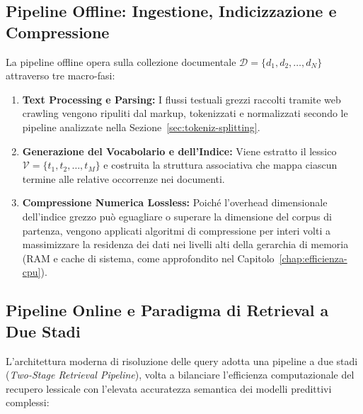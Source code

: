 \subsection[Pipeline Offline: Ingestione e Indicizzazione]{Pipeline Offline: Ingestione, Indicizzazione e Compressione}
La pipeline offline opera sulla collezione documentale $\mathcal{D} = \{d_1, d_2, \dots, d_N\}$ attraverso tre macro-fasi:
\begin{enumerate}
    \item \textbf{Text Processing e Parsing:} I flussi testuali grezzi raccolti tramite web crawling vengono ripuliti dal markup, tokenizzati e normalizzati secondo le pipeline analizzate nella Sezione~\ref{sec:tokeniz-splitting}.
    \item \textbf{Generazione del Vocabolario e dell'Indice:} Viene estratto il lessico $\mathcal{V} = \{t_1, t_2, \dots, t_M\}$ e costruita la struttura associativa che mappa ciascun termine alle relative occorrenze nei documenti.
    \item \textbf{Compressione Numerica Lossless:} Poich\'e l'overhead dimensionale dell'indice grezzo pu\`o eguagliare o superare la dimensione del corpus di partenza, vengono applicati algoritmi di compressione per interi volti a massimizzare la residenza dei dati nei livelli alti della gerarchia di memoria (RAM e cache di sistema, come approfondito nel Capitolo~\ref{chap:efficienza-cpu}).
\end{enumerate}

\subsection{Pipeline Online e Paradigma di Retrieval a Due Stadi}
L'architettura moderna di risoluzione delle query adotta una pipeline a due stadi (\textit{Two-Stage Retrieval Pipeline}), volta a bilanciare l'efficienza computazionale del recupero lessicale con l'elevata accuratezza semantica dei modelli predittivi complessi:

